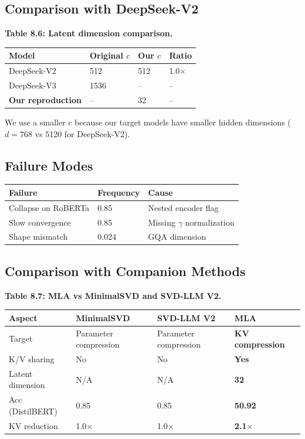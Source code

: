 \subsection{Comparison with DeepSeek-V2}

\textbf{Table 8.6: Latent dimension comparison.}

\begin{table}[H]
\centering
\small
\begin{tabular}{llll}
\toprule
\textbf{Model} & \textbf{Original $c$} & \textbf{Our $c$} & \textbf{Ratio} \\
\midrule
DeepSeek-V2 & 512 & 512 & 1.0$\times$ \\
DeepSeek-V3 & 1536 & -- & -- \\
\textbf{Our reproduction} & -- & 32 & -- \\
\bottomrule
\end{tabular}
\end{table}

We use a smaller $c$ because our target models have smaller hidden 
dimensions ($d = 768$ vs 5120 for DeepSeek-V2).

\subsection{Failure Modes}

\begin{table}[H]
\centering
\small
\begin{tabular}{lll}
\toprule
\textbf{Failure} & \textbf{Frequency} & \textbf{Cause} \\
\midrule
Collapse on RoBERTa & 0.85 & Nested encoder flag \\
Slow convergence & 0.85 & Missing $\gamma$ normalization \\
Shape mismatch & 0.024 & GQA dimension \\
\bottomrule
\end{tabular}
\end{table}

\subsection{Comparison with Companion Methods}

\textbf{Table 8.7: MLA vs MinimalSVD and SVD-LLM V2.}

\begin{table}[H]
\centering
\small
\begin{tabular}{llll}
\toprule
\textbf{Aspect} & \textbf{MinimalSVD} & \textbf{SVD-LLM V2} & \textbf{MLA} \\
\midrule
Target & Parameter compression & Parameter compression & \textbf{KV compression} \\
K/V sharing & No & No & \textbf{Yes} \\
Latent dimension & N/A & N/A & \textbf{32} \\
Acc (DistilBERT) & 0.85 & 0.85 & \textbf{50.92} \\
KV reduction & 1.0$\times$ & 1.0$\times$ & \textbf{2.1$\times$} \\
\bottomrule
\end{tabular}
\end{table}

